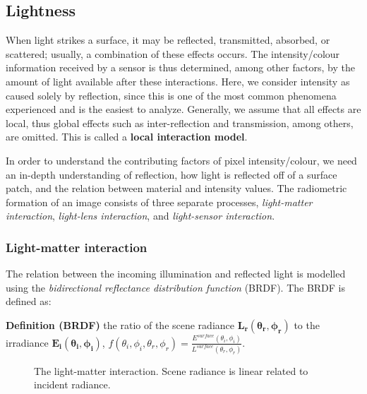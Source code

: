 \subsection{Lightness}
When light strikes a surface, it may be reflected, transmitted, absorbed, or scattered; usually, a combination of these effects occurs. The intensity/colour information received by a sensor is thus determined, among other factors, by the amount of light available after these interactions. Here, we consider intensity as caused solely by reflection, since this is one of the most common phenomena experienced and is the easiest to analyze. Generally, we assume that all effects are local, thus global effects such as inter-reflection and transmission, among others, are omitted. This is called a \textbf{local interaction model}. 

In order to understand the contributing factors of pixel intensity/colour, we need an in-depth understanding of reflection, \ie how light is reflected off of a surface patch, and the relation between material and intensity values. The radiometric formation of an image consists of three separate processes, \textit{light-matter interaction}, \textit{light-lens interaction}, and \textit{light-sensor interaction}.

\subsubsection{Light-matter interaction}
The relation between the incoming illumination and reflected light is modelled using the \textit{bidirectional reflectance distribution function} (BRDF). The BRDF is defined as:

\noindent\textbf{Definition (BRDF)} the ratio of the scene radiance $\mathbf{L_r(\theta_r, \phi_r)}$ to the irradiance $\mathbf{E_i(\theta_i, \phi_i)}$, \ie $f(\theta_i, \phi_i, \theta_r, \phi_r)=\frac{E^{surface}(\theta_i, \phi_i)}{L^{surface}(\theta_r, \phi_r)}$.
\begin{figure}[!htbp]
\centering
{}
\caption{The light-matter interaction. Scene radiance is linear related to incident radiance.}
\label{fig:light_matter_interact}
\end{figure}

